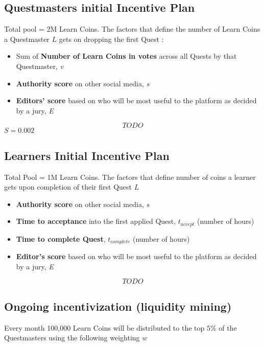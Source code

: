 \documentclass{article}
\begin{document}
    \subsection{Questmasters initial Incentive Plan}
      Total pool = 2M Learn Coins.
      The factors that define the number of Learn Coins a Questmaster \(L\) gets on dropping the first Quest :
      \begin{itemize}
        \item Sum of \textbf{Number of Learn Coins in votes} across all Quests by that Questmaster, \textit{v}
        \item \textbf{Authority score} on other social media, \textit{s}
        \item \textbf{Editors' score} based on who will be most useful to the platform as decided by a jury, \textit{E}
      \end{itemize} 
      \[
        TODO
      \]
      \(S = 0.002\)

    \subsection{Learners Initial Incentive Plan}
      Total Pool = 1M Learn Coins. The factors that define number of coins a learner gets upon completion of their first Quest \(L\)
      \begin{itemize}
        \item \textbf{Authority score} on other social media, \textit{s}
        \item \textbf{Time to acceptance} into the first applied Quest, \(t_{accept}\) (number of hours)
        \item \textbf{Time to complete Quest}, \(t_{complete}\) (number of hours)
        \item \textbf{Editor's score} based on who will be most useful to the platform as decided by a jury, \textit{E}
      \end{itemize}
      \[
        TODO
      \]
    \subsection{Ongoing incentivization (liquidity mining)}
      Every month 100,000 Learn Coins will be distributed to the top \(5\%\) of the Questmasters using the following weighting \(w\) 
\end{document}
